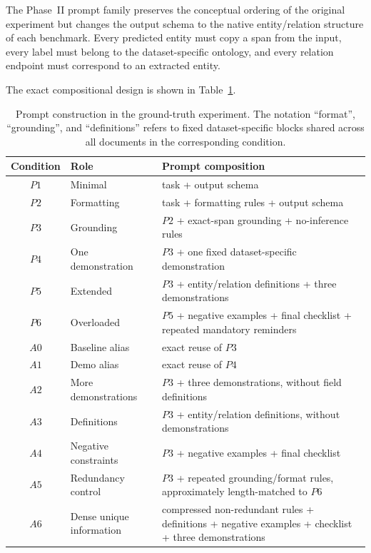 \documentclass[fleqn,10pt]{wlscirep-authoryear}
\begin{document}
The Phase~II prompt family preserves the conceptual ordering of the original
experiment but changes the output schema to the native entity/relation structure
of each benchmark. Every predicted entity must copy a span from the input, every
label must belong to the dataset-specific ontology, and every relation endpoint
must correspond to an extracted entity.

The exact compositional design is shown in Table~\ref{tab:prompt-components}.

\begin{table}[t]
\centering
\caption{Prompt construction in the ground-truth experiment. The notation
``format'', ``grounding'', and ``definitions'' refers to fixed dataset-specific
blocks shared across all documents in the corresponding condition.}
\label{tab:prompt-components}
\begin{tabularx}{\textwidth}{c l X}
\toprule
Condition & Role & Prompt composition \\
\midrule
$P1$ &
Minimal &
task + output schema \\

$P2$ &
Formatting &
task + formatting rules + output schema \\

$P3$ &
Grounding &
$P2$ + exact-span grounding + no-inference rules \\

$P4$ &
One demonstration &
$P3$ + one fixed dataset-specific demonstration \\

$P5$ &
Extended &
$P3$ + entity/relation definitions + three demonstrations \\

$P6$ &
Overloaded &
$P5$ + negative examples + final checklist + repeated mandatory reminders \\
\midrule
$A0$ &
Baseline alias &
exact reuse of $P3$ \\

$A1$ &
Demo alias &
exact reuse of $P4$ \\

$A2$ &
More demonstrations &
$P3$ + three demonstrations, without field definitions \\

$A3$ &
Definitions &
$P3$ + entity/relation definitions, without demonstrations \\

$A4$ &
Negative constraints &
$P3$ + negative examples + final checklist \\

$A5$ &
Redundancy control &
$P3$ + repeated grounding/format rules, approximately length-matched to $P6$ \\

$A6$ &
Dense unique information &
compressed non-redundant rules + definitions + negative examples +
checklist + three demonstrations \\
\bottomrule
\end{tabularx}
\end{table}
\end{document}
